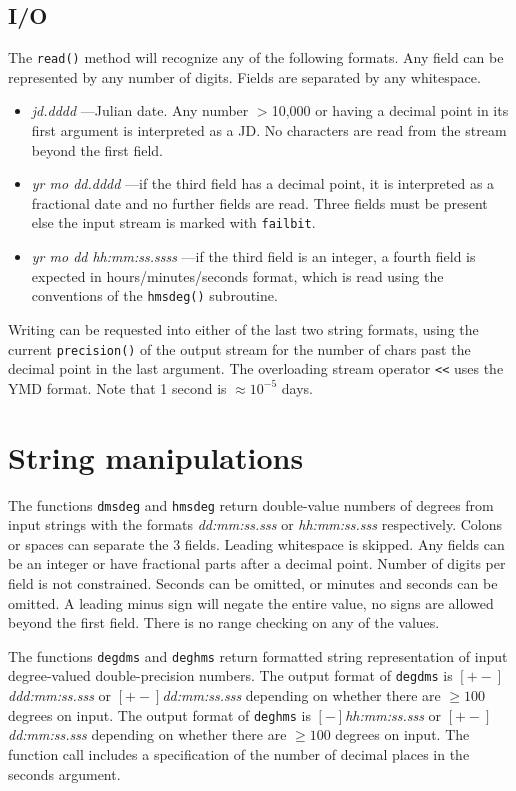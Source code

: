 \documentclass[11pt,preprint,flushrt]{aastex}
\begin{document}
\subsection{I/O}
The {\tt read()} method will recognize any of the following formats.  Any field can be represented by any number of digits.  Fields are separated by any whitespace.
\begin{itemize}
\item {\it jd.dddd} ---Julian date.  Any number $>$10,000 or having a decimal point in its first argument is interpreted as a JD.  No characters are read from the stream beyond the first field.
\item{\it yr mo dd.dddd} ---if the third field has a decimal point, it is interpreted as a fractional date and no further fields are read.  Three fields must be present else the input stream is marked with {\tt failbit}.
\item{\it yr mo dd hh:mm:ss.ssss} ---if the third field is an integer, a fourth field is expected in hours/minutes/seconds format, which is read using the conventions of the {\tt hmsdeg()} subroutine.
\end{itemize}
Writing can be requested into either of the last two string formats, using the current {\tt precision()} of the output stream for the number of chars past the decimal point in the last argument.  The overloading stream operator {\tt <<} uses the YMD format.  Note that 1 second is $\approx10^{-5}$ days.

\section{String manipulations}
The functions {\tt dmsdeg} and {\tt hmsdeg} return double-value numbers of degrees from input strings with the formats {\it dd:mm:ss.sss} or {\it hh:mm:ss.sss} respectively.  
Colons or spaces can separate the 3 fields.  Leading whitespace is skipped.  Any fields can be an integer or have fractional parts after a decimal point.  Number of digits per field is not constrained.  Seconds can be omitted, or minutes and seconds can be omitted.  A leading minus sign will negate the entire value, no signs are allowed beyond the first field.  There is no range checking on any of the values.

The functions {\tt degdms} and {\tt deghms} return formatted string representation of input degree-valued double-precision numbers.  The output format of {\tt degdms}  is {\it $[+-]$ddd:mm:ss.sss} or {\it $[+-]$dd:mm:ss.sss} depending on whether there are $\ge100$ degrees on input. The output format of {\tt deghms}  is {\it $[-]$hh:mm:ss.sss} or {\it $[+-]$dd:mm:ss.sss} depending on whether there are $\ge100$ degrees on input.  The function call includes a specification of the number of decimal places in the seconds argument.
\end{document}
